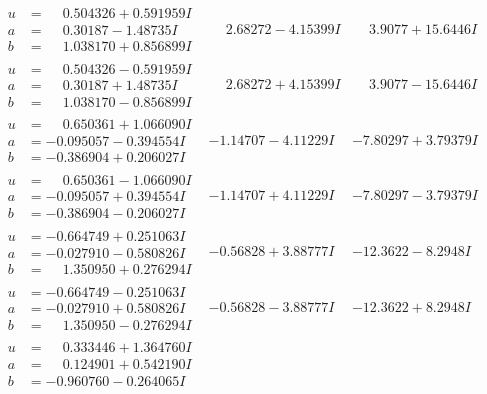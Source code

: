 \documentclass[1p]{elsarticle_modified}
\theoremstyle{definition}
\begin{document}
$$\begin{array}{c|c|c}
\begin{aligned}
u &= \phantom{-}0.504326 + 0.591959 I \\
a &= \phantom{-}0.30187 - 1.48735 I \\
b &= \phantom{-}1.038170 + 0.856899 I\end{aligned}
 & \phantom{-}2.68272 - 4.15399 I & \phantom{-}3.9077 + 15.6446 I \\ \hline\begin{aligned}
u &= \phantom{-}0.504326 - 0.591959 I \\
a &= \phantom{-}0.30187 + 1.48735 I \\
b &= \phantom{-}1.038170 - 0.856899 I\end{aligned}
 & \phantom{-}2.68272 + 4.15399 I & \phantom{-}3.9077 - 15.6446 I \\ \hline\begin{aligned}
u &= \phantom{-}0.650361 + 1.066090 I \\
a &= -0.095057 - 0.394554 I \\
b &= -0.386904 + 0.206027 I\end{aligned}
 & -1.14707 - 4.11229 I & -7.80297 + 3.79379 I \\ \hline\begin{aligned}
u &= \phantom{-}0.650361 - 1.066090 I \\
a &= -0.095057 + 0.394554 I \\
b &= -0.386904 - 0.206027 I\end{aligned}
 & -1.14707 + 4.11229 I & -7.80297 - 3.79379 I \\ \hline\begin{aligned}
u &= -0.664749 + 0.251063 I \\
a &= -0.027910 - 0.580826 I \\
b &= \phantom{-}1.350950 + 0.276294 I\end{aligned}
 & -0.56828 + 3.88777 I & -12.3622 - 8.2948 I \\ \hline\begin{aligned}
u &= -0.664749 - 0.251063 I \\
a &= -0.027910 + 0.580826 I \\
b &= \phantom{-}1.350950 - 0.276294 I\end{aligned}
 & -0.56828 - 3.88777 I & -12.3622 + 8.2948 I \\ \hline\begin{aligned}
u &= \phantom{-}0.333446 + 1.364760 I \\
a &= \phantom{-}0.124901 + 0.542190 I \\
b &= -0.960760 - 0.264065 I\end{aligned}

\end{array}$$
\end{document}
